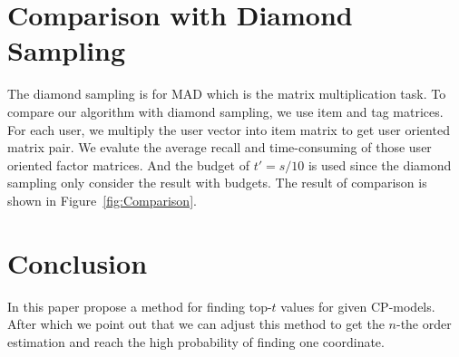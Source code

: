 \documentclass[letterpaper]{article}
\newcommand{\Fig}[1]   {Figure~\ref{fig:#1}}
\begin{document}
\section{Comparison with Diamond Sampling}
The diamond sampling is for MAD which is the matrix multiplication task.
To compare our algorithm with diamond sampling, we use item and tag matrices.
For each user, we multiply the user vector into item matrix
to get user oriented matrix pair.
We evalute the average recall and time-consuming of those user oriented factor matrices.
And the budget of $t'=s/10$ is used since the diamond sampling only consider the result with budgets.
The result of comparison is shown in \Fig{Comparison}.
\section{Conclusion}
In this paper propose a method for finding top-$t$ values for given CP-models.
After which we point out that we can adjust this method to get the $n$-the order estimation
and reach the high probability of finding one coordinate.


\end{document}
